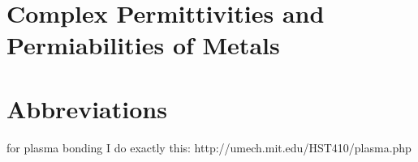 \documentclass[a4paper,titlepage,onecolumn]{report}
\begin{document}
\section{Complex Permittivities and Permiabilities of Metals}


\section{Abbreviations}

for plasma bonding I do exactly this:
http://umech.mit.edu/HST410/plasma.php



\end{document}
